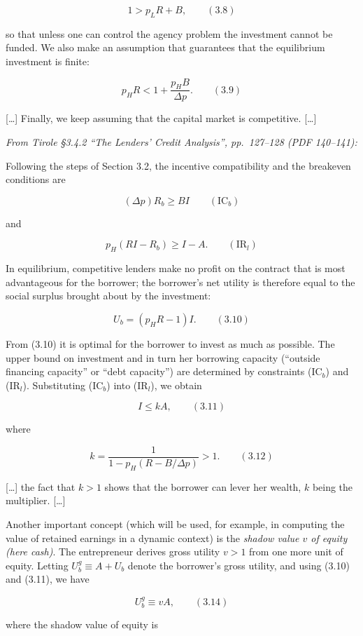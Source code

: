 \documentclass[11pt,a4paper]{article}
\begin{document}
\[1 > p_L R + B, \qquad (3.8)\]

so that unless one can control the agency problem the investment cannot be funded. We also make an
assumption that guarantees that the equilibrium investment is finite:

\[p_H R < 1 + \frac{p_H B}{\Delta p}. \qquad (3.9)\]

{[}\ldots{]} Finally, we keep assuming that the capital market is competitive. {[}\ldots{]}

\emph{From Tirole §3.4.2 ``The Lenders' Credit Analysis'', pp.~127--128 (PDF 140--141):}

Following the steps of Section 3.2, the incentive compatibility and the breakeven conditions are

\[(\Delta p) R_b \geqslant BI \qquad (\text{IC}_b)\]

and

\[p_H(RI - R_b) \geqslant I - A. \qquad (\text{IR}_l)\]

In equilibrium, competitive lenders make no profit on the contract that is most advantageous for the
borrower; the borrower's net utility is therefore equal to the social surplus brought about by the
investment:

\[U_b = (p_H R - 1) I. \qquad (3.10)\]

From (3.10) it is optimal for the borrower to invest as much as possible. The upper bound on
investment and in turn her borrowing capacity (``outside financing capacity'' or ``debt capacity'')
are determined by constraints (IC\(_b\)) and (IR\(_l\)). Substituting (IC\(_b\)) into (IR\(_l\)), we
obtain

\[I \leqslant kA, \qquad (3.11)\]

where

\[k = \frac{1}{1 - p_H(R - B/\Delta p)} > 1. \qquad (3.12)\]

{[}\ldots{]} the fact that \(k > 1\) shows that the borrower can lever her wealth, \(k\) being the
multiplier. {[}\ldots{]}

Another important concept (which will be used, for example, in computing the value of retained
earnings in a dynamic context) is the \emph{shadow value \(v\) of equity (here cash)}. The
entrepreneur derives gross utility \(v > 1\) from one more unit of equity. Letting
\(U_b^g \equiv A + U_b\) denote the borrower's gross utility, and using (3.10) and (3.11), we have

\[U_b^g \equiv vA, \qquad (3.14)\]

where the shadow value of equity is
\end{document}
